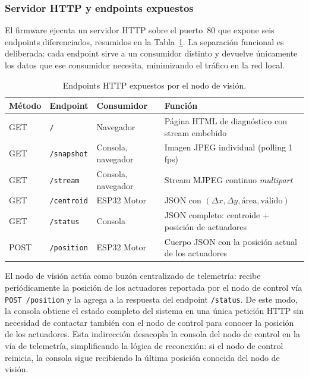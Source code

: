 \subsubsection{Servidor HTTP y endpoints expuestos}
El firmware ejecuta un servidor HTTP sobre el puerto~80 que expone seis endpoints diferenciados, resumidos en la Tabla~\ref{tab:endpoints_cam}. La separación funcional es deliberada: cada endpoint sirve a un consumidor distinto y devuelve únicamente los datos que ese consumidor necesita, minimizando el tráfico en la red local.

\begin{table}[htbp]
    \centering
    \footnotesize
    \begin{tabular}{lllp{6cm}}
        \toprule
        \textbf{Método} & \textbf{Endpoint} & \textbf{Consumidor} & \textbf{Función} \\
        \midrule
        GET  & \texttt{/}         & Navegador        & Página HTML de diagnóstico con stream embebido \\
        GET  & \texttt{/snapshot} & Consola, navegador & Imagen JPEG individual (polling 1\,fps) \\
        GET  & \texttt{/stream}   & Consola, navegador & Stream MJPEG continuo \emph{multipart} \\
        GET  & \texttt{/centroid} & ESP32 Motor       & JSON con $(\Delta x, \Delta y, \text{área}, \text{válido})$ \\
        GET  & \texttt{/status}   & Consola           & JSON completo: centroide + posición de actuadores \\
        POST & \texttt{/position} & ESP32 Motor       & Cuerpo JSON con la posición actual de los actuadores \\
        \bottomrule
    \end{tabular}
    \caption{Endpoints HTTP expuestos por el nodo de visión.}
    \label{tab:endpoints_cam}
\end{table}

El nodo de visión actúa como buzón centralizado de telemetría: recibe periódicamente la posición de los actuadores reportada por el nodo de control vía \texttt{POST /position} y la agrega a la respuesta del endpoint \texttt{/status}. De este modo, la consola obtiene el estado completo del sistema en una única petición HTTP sin necesidad de contactar también con el nodo de control para conocer la posición de los actuadores. Esta indirección desacopla la consola del nodo de control en la vía de telemetría, simplificando la lógica de reconexión: si el nodo de control reinicia, la consola sigue recibiendo la última posición conocida del nodo de visión.

